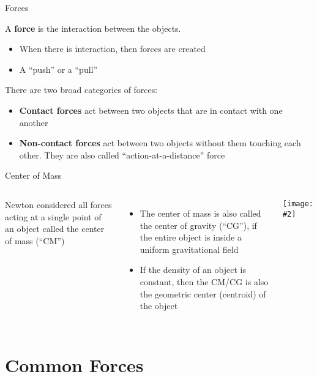 \documentclass[12pt,compress,aspectratio=169]{beamer}
\newcommand{\pic}[2]{\texttt{[image: \#2]}}
\begin{document}
\begin{frame}{Forces}

  A \textbf{force} is the interaction between the objects.
  \begin{itemize}
  \item When there is interaction, then forces are created
  \item A ``push'' or a ``pull''
  \end{itemize}

  There are two broad categories of forces:
  \begin{itemize}
  \item\textbf{Contact forces} act between two objects that are in contact
    with one another
  \item\textbf{Non-contact forces} act between two objects without them
    touching each other. They are also called ``action-at-a-distance'' force
  \end{itemize}
\end{frame}



\begin{frame}{Center of Mass}
  \vspace{.2in}
  \begin{columns}
    Newton considered all forces acting at a single point of an object called
    the center of mass (``CM'')
    \begin{itemize}
    \item The center of mass is also called the center of gravity (``CG''), if
      the entire object is inside a uniform gravitational field
    \item If the density of an object is constant, then the CM/CG is also the
      geometric center (centroid) of the object
    \end{itemize}

    \pic{1}{graphics/cofm.png}
  \end{columns}
\end{frame}

\section{Common Forces}
\end{document}
